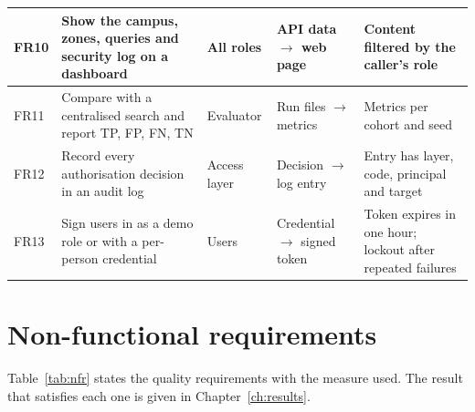 \documentclass[12pt,a4paper,oneside]{report}
\begin{document}
{\begin{longtable}{|p{0.93cm}|p{3.75cm}|p{1.87cm}|p{3.19cm}|p{3.94cm}|}
FR10 & Show the campus, zones, queries and security log on a dashboard & All roles & API data $\rightarrow$ web page & Content filtered by the caller's role\\\hline
FR11 & Compare with a centralised search and report TP, FP, FN, TN & Evaluator & Run files $\rightarrow$ metrics & Metrics per cohort and seed\\\hline
FR12 & Record every authorisation decision in an audit log & Access layer & Decision $\rightarrow$ log entry & Entry has layer, code, principal and target\\\hline
FR13 & Sign users in as a demo role or with a per-person credential & Users & Credential $\rightarrow$ signed token & Token expires in one hour; lockout after repeated failures\\\hline
\end{longtable}}


\section{Non-functional requirements}
Table~\ref{tab:nfr} states the quality requirements with the measure used. The result that satisfies each one is given in Chapter~\ref{ch:results}.
\end{document}

